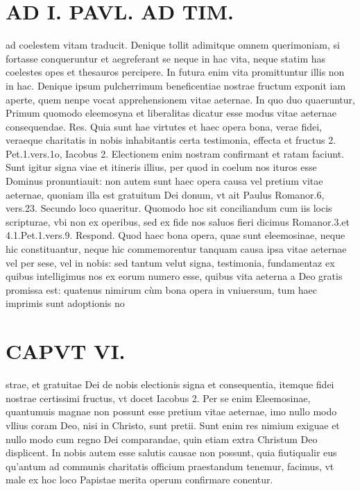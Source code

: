 \documentclass{article}
\begin{document}
\begin{pages}
\section*{AD I. PAVL. AD TIM. }
\marginpar{[ p.J00. ]}\pstart ad coelestem vitam traducit. Denique tollit adimitque omnem querimoniam, si fortasse conqueruntur et aegreferant se neque in hac vita, neque statim has coelestes opes et thesauros percipere. In futura enim vita promittuntur illis non in hac.  \pend\pstart Denique ipsum pulcherrimum beneficentiae nostrae fructum exponit iam aperte, quem nenpe vocat apprehensionem vitae aeternae. In quo duo quaeruntur, Primum quomodo eleemosyna et liberalitas dicatur esse modus vitae aeternae consequendae. Res. Quia sunt hae virtutes et haec opera bona, verae fidei, veraeque charitatis in nobis inhabitantis certa testimonia, effecta et fructus 2. Pet.1.vers.1o, Iacobus 2. Electionem enim nostram confirmant et ratam faciunt. Sunt igitur signa viae et itineris illius, per quod in coelum nos ituros esse Dominus pronuntiauit: non autem sunt haec opera causa vel pretium vitae aeternae, quoniam illa est gratuitum Dei donum, vt ait Paulus Romanor.6, vers.23.  \pend\pstart Secundo loco quaeritur. Quomodo hoc sit conciliandum cum iis locis scripturae, vbi non ex operibus, sed ex fide nos saluos fieri dicimus Romanor.3.et 4.1.Pet.1.vers.9. Respond. Quod haec bona opera, quae sunt eleemosinae, neque hic constituantur, neque hic commemorentur tanquam causa ipsa vitae aeternae vel per sese, vel in nobis: sed tantum velut signa, testimonia, fundamentaz ex quibus intelligimus nos ex eorum numero esse, quibus vita aeterna a Deo gratis promissa est: quatenus nimirum cùm bona opera in vniuersum, tum haec imprimis sunt adoptionis no\pend
\section*{CAPVT  VI. }
\marginpar{[ p.]}\pstart strae, et gratuitae Dei de nobis electionis signa et consequentia, itemque fidei nostrae certissimi fructus, vt docet Iacobus 2. Per se enim Eleemosinae, quantumuis magnae non possunt esse pretium vitae aeternae, imo nullo modo vllius coram Deo, nisi in Christo, sunt pretii. Sunt enim res nimium exiguae et nullo modo cum regno Dei comparandae, quin etiam extra Christum Deo displicent. In nobis autem esse salutis causae non possunt, quia fiutiqualir eus qu'antum ad communis charitatis officium praestandum tenemur, facimus, vt male ex hoc loco Papistae merita operum confirmare conentur.  \pend
{}
{}

\end{pages}
\end{document}
